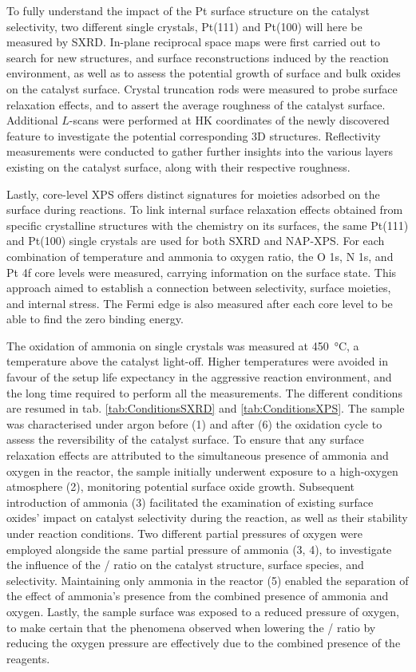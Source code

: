 To fully understand the impact of the Pt surface structure on the catalyst selectivity, two different single crystals, Pt(111) and Pt(100) will here be measured by SXRD.
In-plane reciprocal space maps were first carried out to search for new structures, and surface reconstructions induced by the reaction environment, as well as to assess the potential growth of surface and bulk oxides on the catalyst surface.
Crystal truncation rods were measured to probe surface relaxation effects, and to assert the average roughness of the catalyst surface.
Additional $L$-scans were performed at HK coordinates of the newly discovered feature to investigate the potential corresponding 3D structures.
Reflectivity measurements were conducted to gather further insights into the various layers existing on the catalyst surface, along with their respective roughness.

Lastly, core-level XPS offers distinct signatures for moieties adsorbed on the surface during reactions.
To link internal surface relaxation effects obtained from specific crystalline structures with the chemistry on its surfaces, the same Pt(111) and Pt(100) single crystals are used for both SXRD and NAP-XPS.
For each combination of temperature and ammonia to oxygen ratio, the O 1s, N 1s, and Pt 4f core levels were measured, carrying information on the surface state.
This approach aimed to establish a connection between selectivity, surface moieties, and internal stress.
The Fermi edge is also measured after each core level to be able to find the zero binding energy.

The oxidation of ammonia on single crystals was measured at \qty{450}{\degreeCelsius}, a temperature above the catalyst light-off.
Higher temperatures were avoided in favour of the setup life expectancy in the aggressive reaction environment, and the long time required to perform all the measurements.
The different conditions are resumed in tab. \ref{tab:ConditionsSXRD} and \ref{tab:ConditionsXPS}.
The sample was characterised under argon before (1) and after (6) the oxidation cycle to assess the reversibility of the catalyst surface.
To ensure that any surface relaxation effects are attributed to the simultaneous presence of ammonia and oxygen in the reactor, the sample initially underwent exposure to a high-oxygen atmosphere (2), monitoring potential surface oxide growth.
Subsequent introduction of ammonia (3) facilitated the examination of existing surface oxides' impact on catalyst selectivity during the reaction, as well as their stability under reaction conditions.
Two different partial pressures of oxygen were employed alongside the same partial pressure of ammonia (3, 4), to investigate the influence of the / ratio on the catalyst structure, surface species, and selectivity.
Maintaining only ammonia in the reactor (5) enabled the separation of the effect of ammonia's presence from the combined presence of ammonia and oxygen.
Lastly, the sample surface was exposed to a reduced pressure of oxygen, to make certain that the phenomena observed when lowering the / ratio by reducing the oxygen pressure are effectively due to the combined presence of the reagents.

